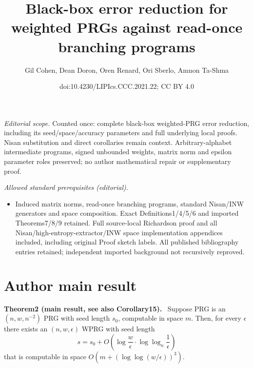 \documentclass[10pt,a4paper]{article}
\title{Black-box error reduction for weighted PRGs against read-once branching programs}
\author{Gil Cohen, Dean Doron, Oren Renard, Ori Sberlo, Amnon Ta-Shma}
\date{doi:10.4230/LIPIcs.CCC.2021.22; CC BY 4.0}
\newenvironment{authorclaim}[1]{\par\medskip\noindent\textbf{#1.}\ }{\par\medskip}
\begin{document}
\maketitle
\noindent\textit{Editorial scope.} Counted once: complete black-box weighted-PRG error reduction, including its seed/space/accuracy parameters and full underlying local proofs. Nisan substitution and direct corollaries remain context. Arbitrary-alphabet intermediate programs, signed unbounded weights, matrix norm and epsilon parameter roles preserved; no author mathematical repair or supplementary proof.\par\medskip
\noindent\textit{Allowed standard prerequisites (editorial).}\begin{itemize}
\item Induced matrix norms, read-once branching programs, standard Nisan/INW generators and space composition. Exact Definitions1/4/5/6 and imported Theorems7/8/9 retained. Full source-local Richardson proof and all Nisan/high-entropy-extractor/INW space implementation appendices included, including original Proof sketch labels. All published bibliography entries retained; independent imported background not recursively reproved.
\end{itemize}\medskip
\section*{Author main result}

\begin{authorclaim}{Theorem2 (main result, see also Corollary15)}
Suppose PRG is an $(n,w,n^{-2})$ PRG with seed length $s_0$, computable in space $m$. Then, for every $\epsilon$ there exists an $(n,w,\epsilon)$ WPRG with seed length
\[s=s_0+O\left(\log\frac w\epsilon\cdot\log\log_n\frac1\epsilon\right)\]
that is computable in space $O(m+(\log\log(w/\epsilon))^3)$.
\end{authorclaim}
\end{document}

